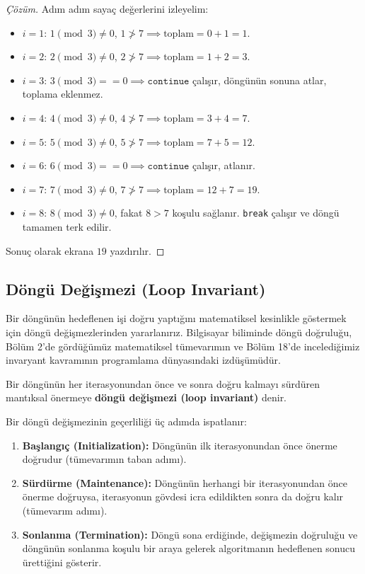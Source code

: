 \begin{proof}[Çözüm]
Adım adım sayaç değerlerini izleyelim:
\begin{itemize}
    \item $i = 1$: $1 \pmod 3 \neq 0$, $1 \not> 7 \implies \text{toplam} = 0 + 1 = 1$.
    \item $i = 2$: $2 \pmod 3 \neq 0$, $2 \not> 7 \implies \text{toplam} = 1 + 2 = 3$.
    \item $i = 3$: $3 \pmod 3 == 0 \implies \texttt{continue}$ çalışır, döngünün sonuna atlar, toplama eklenmez.
    \item $i = 4$: $4 \pmod 3 \neq 0$, $4 \not> 7 \implies \text{toplam} = 3 + 4 = 7$.
    \item $i = 5$: $5 \pmod 3 \neq 0$, $5 \not> 7 \implies \text{toplam} = 7 + 5 = 12$.
    \item $i = 6$: $6 \pmod 3 == 0 \implies \texttt{continue}$ çalışır, atlanır.
    \item $i = 7$: $7 \pmod 3 \neq 0$, $7 \not> 7 \implies \text{toplam} = 12 + 7 = 19$.
    \item $i = 8$: $8 \pmod 3 \neq 0$, fakat $8 > 7$ koşulu sağlanır. \texttt{break} çalışır ve döngü tamamen terk edilir.
\end{itemize}
Sonuç olarak ekrana $19$ yazdırılır.
\end{proof}

\subsection{Döngü Değişmezi (Loop Invariant)}

Bir döngünün hedeflenen işi doğru yaptığını matematiksel kesinlikle göstermek için döngü değişmezlerinden yararlanırız. Bilgisayar biliminde döngü doğruluğu, Bölüm 2'de gördüğümüz matematiksel tümevarımın ve Bölüm 18'de incelediğimiz invaryant kavramının programlama dünyasındaki izdüşümüdür.

\begin{definition}
Bir döngünün her iterasyonundan önce ve sonra doğru kalmayı sürdüren mantıksal önermeye \textbf{döngü değişmezi (loop invariant)} denir.
\end{definition}

Bir döngü değişmezinin geçerliliği üç adımda ispatlanır:
\begin{enumerate}
    \item \textbf{Başlangıç (Initialization):} Döngünün ilk iterasyonundan önce önerme doğrudur (tümevarımın taban adımı).
    \item \textbf{Sürdürme (Maintenance):} Döngünün herhangi bir iterasyonundan önce önerme doğruysa, iterasyonun gövdesi icra edildikten sonra da doğru kalır (tümevarım adımı).
    \item \textbf{Sonlanma (Termination):} Döngü sona erdiğinde, değişmezin doğruluğu ve döngünün sonlanma koşulu bir araya gelerek algoritmanın hedeflenen sonucu ürettiğini gösterir.
\end{enumerate}

